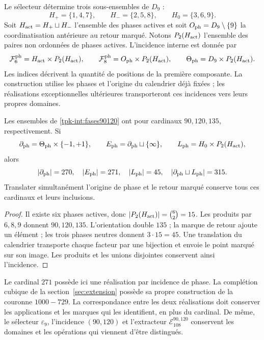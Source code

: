 Le sélecteur détermine trois sous-ensembles de \(D_9\) :
\[
 H_+=\{1,4,7\},\qquad H_-=\{2,5,8\},\qquad H_0=\{3,6,9\}.
\]
Soit \(H_{\rm act}=H_+\sqcup H_-\) l'ensemble des phases actives et
soit \(O_{\rm ph}=D_9\setminus\{9\}\) la coordinatisation antérieure au retour
marqué. Notons \(P_2(H_{\rm act})\) l'ensemble des paires
non ordonnées de phases actives. L'incidence interne est donnée par
\begin{equation}
 \mathcal F^{\rm ph}_6=H_{\rm act}\times P_2(H_{\rm act}),\qquad
 \mathcal F^{\rm ph}_8=O_{\rm ph}\times P_2(H_{\rm act}),\qquad
 \Theta_{\rm ph}=D_9\times P_2(H_{\rm act}).
 \label{tpk-int:fases90120}
\end{equation}
Les indices décrivent la quantité de positions de la première composante.
La construction utilise les phases et l'origine du calendrier déjà fixées ;
les réalisations exceptionnelles ultérieures transporteront ces
incidences vers leurs propres domaines.

\begin{proposition}
\label{tpk-int:cardinales}
Les ensembles de \eqref{tpk-int:fases90120} ont pour cardinaux \(90,120,135\), respectivement. Si
\[
 \partial_{\rm ph}=\Theta_{\rm ph}\times\{-1,+1\},\qquad
 E_{\rm ph}=\partial_{\rm ph}\sqcup\{\infty\},\qquad
 L_{\rm ph}=H_0\times P_2(H_{\rm act}),
\]
alors
\[
 |\partial_{\rm ph}|=270,\quad |E_{\rm ph}|=271,\quad
 |L_{\rm ph}|=45,\quad
 |\partial_{\rm ph}\sqcup L_{\rm ph}|=315.
\]
Translater simultanément l'origine de phase et le retour marqué conserve
tous ces cardinaux et leurs inclusions.
\end{proposition}
\begin{proof}
Il existe six phases actives, donc
\(|P_2(H_{\rm act})|=\binom62=15\). Les produits par
\(6,8,9\) donnent \(90,120,135\). L'orientation double \(135\) ;
la marque de retour ajoute un élément ; les trois phases neutres donnent
\(3\cdot15=45\). Une translation du calendrier transporte chaque
facteur par une bijection et envoie le point marqué sur son image. Les
produits et les unions disjointes conservent ainsi l'incidence.
\end{proof}

Le cardinal \(271\) possède ici une réalisation par incidence de phase. La complétion cubique de la section~\ref{sec:extension} possède sa propre construction de la couronne \(1000-729\). La correspondance entre les deux réalisations doit conserver les applications et les marques qui les identifient, en plus du cardinal. De même, le sélecteur \(\varepsilon_9\), l'incidence \((90,120)\) et l'extracteur \(\mathcal E_{108}^{90,120}\) conservent les domaines et les opérations qui viennent d'être distingués.

